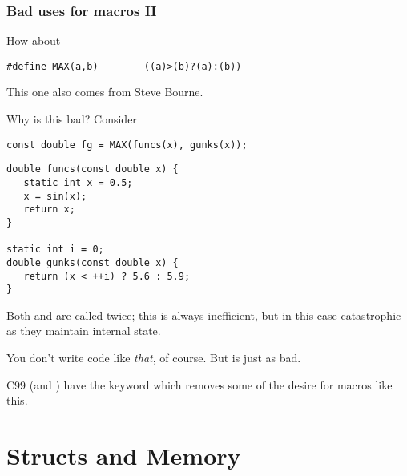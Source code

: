 \documentclass[10pt, t]{beamer}
\begin{document}
\begin{frame}[fragile]
\frametitle{Bad uses for macros II}
\label{sec-4_1_7}

How about
\begin{verbatim}
#define MAX(a,b)        ((a)>(b)?(a):(b))
\end{verbatim}
This one also comes from Steve Bourne.

\pause
Why is this bad?  Consider
\begin{verbatim}
const double fg = MAX(funcs(x), gunks(x));
\end{verbatim}
\pause
\begin{verbatim}
double funcs(const double x) {
   static int x = 0.5;
   x = sin(x);
   return x;
}

static int i = 0;
double gunks(const double x) {
   return (x < ++i) ? 5.6 : 5.9;
}
\end{verbatim}
\pause
Both  and  are called twice; this is always inefficient, but in this case
 catastrophic as they maintain internal state.

\pause
You don't write code like \emph{that}, of course.  But  is just as bad.

\pause
C99 (and \CPP) have the  keyword which removes some of the desire for macros like this.
\end{frame}
\section{Structs and Memory}
\label{sec-5}
\end{document}
